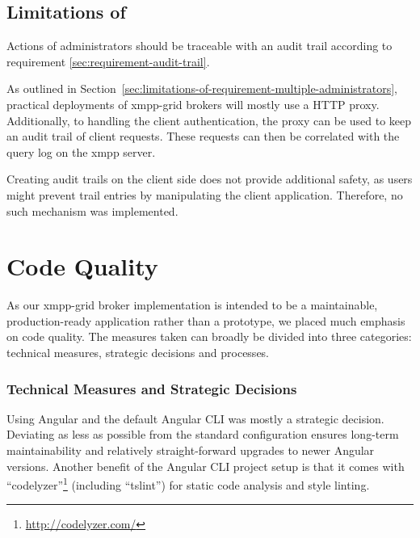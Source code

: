 \subsection{Limitations of \emph{}}

Actions of administrators should be traceable with an audit trail according to requirement \ref{sec:requirement-audit-trail}.

As outlined in Section~\ref{sec:limitations-of-requirement-multiple-administrators}, practical deployments of \gls{xmpp-grid} \glspl{broker} will mostly use a HTTP proxy.
Additionally, to handling the client authentication, the proxy can be used to keep an audit trail of client requests.
These requests can then be correlated with the query log on the \gls{xmpp} server.

Creating audit trails on the client side does not provide additional safety, as users might prevent trail entries by manipulating the client application.
Therefore, no such mechanism was implemented.



\section{Code Quality}
As our \gls{xmpp-grid} \gls{broker} implementation is intended to be a maintainable, production-ready application rather than a prototype, we placed much emphasis on code quality.
The measures taken can broadly be divided into three categories: technical measures, strategic decisions and processes.

\subsubsection{Technical Measures and Strategic Decisions}
Using Angular and the default Angular CLI was mostly a strategic decision.
Deviating as less as possible from the standard configuration ensures long-term maintainability and relatively straight-forward upgrades to newer Angular versions.
Another benefit of the Angular CLI project setup is that it comes with ``codelyzer''\footnote{\url{http://codelyzer.com/}} (including ``tslint'') for static code analysis and style linting.

